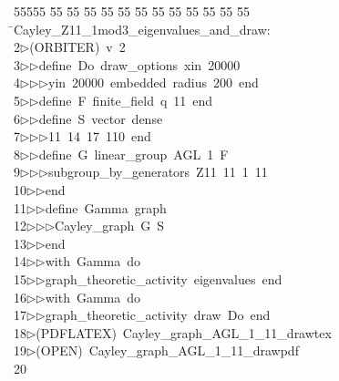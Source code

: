 %
%
\begin{tabbing}
55555 \= 55 \= 55 \= 55 \= 55 \= 55 \= 55 \= 55 \= 55 \= 55 \= 55 \= 55 \= 55 \= \>Cayley\_Z11\_1mod3\_eigenvalues\_and\_draw:\\[0pt]
2\>$\triangleright$\>(ORBITER)\ v\ 2\ \\[0pt]
3\>$\triangleright$\>$\triangleright$\>define\ Do\ draw\_options\ xin\ 20000\ \\[0pt]
4\>$\triangleright$\>$\triangleright$\>$\triangleright$\>yin\ 20000\ embedded\ radius\ 200\ end\ \\[0pt]
5\>$\triangleright$\>$\triangleright$\>define\ F\ finite\_field\ q\ 11\ end\ \\[0pt]
6\>$\triangleright$\>$\triangleright$\>define\ S\ vector\ dense\ \\[0pt]
7\>$\triangleright$\>$\triangleright$\>$\triangleright$\>11\ 14\ 17\ 110\ end\ \\[0pt]
8\>$\triangleright$\>$\triangleright$\>define\ G\ linear\_group\ AGL\ 1\ F\ \\[0pt]
9\>$\triangleright$\>$\triangleright$\>$\triangleright$\>subgroup\_by\_generators\ Z11\ 11\ 1\ 11\ \\[0pt]
10\>$\triangleright$\>$\triangleright$\>end\ \\[0pt]
11\>$\triangleright$\>$\triangleright$\>define\ Gamma\ graph\ \\[0pt]
12\>$\triangleright$\>$\triangleright$\>$\triangleright$\>Cayley\_graph\ G\ S\ \\[0pt]
13\>$\triangleright$\>$\triangleright$\>end\ \\[0pt]
14\>$\triangleright$\>$\triangleright$\>with\ Gamma\ do\ \\[0pt]
15\>$\triangleright$\>$\triangleright$\>graph\_theoretic\_activity\ eigenvalues\ end\ \\[0pt]
16\>$\triangleright$\>$\triangleright$\>with\ Gamma\ do\ \\[0pt]
17\>$\triangleright$\>$\triangleright$\>graph\_theoretic\_activity\ draw\ Do\ end\\[0pt]
18\>$\triangleright$\>(PDFLATEX)\ Cayley\_graph\_AGL\_1\_11\_drawtex\\[0pt]
19\>$\triangleright$\>(OPEN)\ Cayley\_graph\_AGL\_1\_11\_drawpdf\\[0pt]
20\>\end{tabbing}
